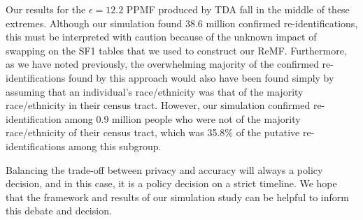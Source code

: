 \documentclass{article}
\begin{document}
Our results for the $\epsilon=12.2$ PPMF produced by TDA fall in the middle of these extremes.  Although our simulation found 38.6 million confirmed re-identifications, this must be interpreted with caution because of the unknown impact of swapping on the SF1 tables that we used to construct our ReMF. Furthermore, as we have noted previously, the overwhelming majority of the confirmed re-identifications found by this approach would also have been found simply by assuming that an individual's race/ethnicity was that of the majority race/ethnicity in their census tract. However, our simulation confirmed re-identification among 0.9 million people who were not of the majority race/ethnicity of their census tract, which was 35.8\% of the putative re-identifications among this subgroup.

Balancing the trade-off between privacy and accuracy will always a policy decision, and in this case, it 
is a policy decision on a strict timeline.  We hope that the framework and results of our simulation study can be helpful to inform this debate and decision.





\end{document}
